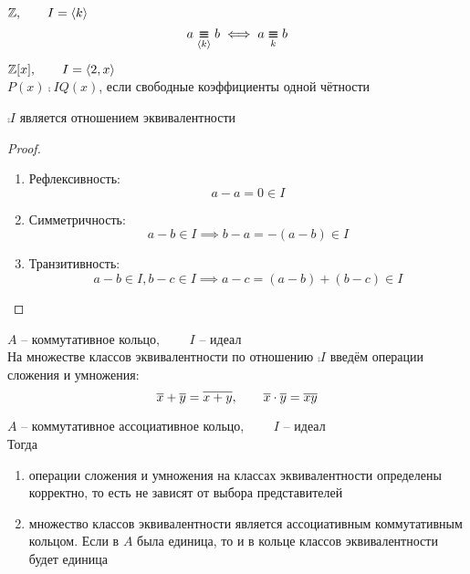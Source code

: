 \begin{exmpls}
	\item $ \mathbb{Z}, \qquad I = \Braket{k} $
	$$ a \comp{\braket{k}} b \iff a \comp{k} b $$
	\item $ \mathbb{Z}[x], \qquad I = \Braket{2, x} $ \\
	$ P(x) \comp{I} Q(x) $, если свободные коэффициенты одной чётности
\end{exmpls}

\begin{property}
	$ \comp{I} $ является отношением эквивалентности
\end{property}

\begin{proof}
	\hfill
	\begin{enumerate}
		\item Рефлексивность:
		$$ a - a = 0 \in I $$
		\item Симметричность:
		$$ a - b \in I \implies b - a = -(a - b) \in I $$
		\item Транзитивность:
		$$ a - b \in I, b - c \in I \implies a - c = (a - b) + (b - c) \in I $$
	\end{enumerate}
\end{proof}

\begin{definition}
	$ A $ -- коммутативное кольцо, $ \qquad I $ -- идеал \\
	На множестве классов эквивалентности по отношению $ \comp{I} $ введём операции сложения и умножения:
	$$ \overline{x} + \overline{y} = \overline{x + y}, \qquad \overline{x} \cdot \overline{y} = \overline{xy} $$
\end{definition}

\begin{theorem}[корректность]
	$ A $ -- коммутативное ассоциативное кольцо, $ \qquad I $ -- идеал \\
	Тогда
	\begin{enumerate}
		\item операции сложения и умножения на классах эквивалентности определены корректно, то есть не зависят от выбора представителей

		\item множество классов эквивалентности является ассоциативным коммутативным кольцом. Если в $ A $ была единица, то и в кольце классов эквивалентности будет единица
	\end{enumerate}
\end{theorem}

